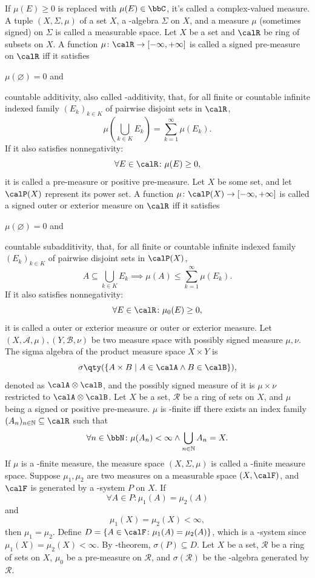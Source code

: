 \documentclass[a4paper,12pt]{article}
\begin{document}
If $\mu(E)\geq 0$ is replaced with $\mu(E)\in\bbC$, it's called a complex-valued measure.
A tuple $(X,\Sigma,\mu)$ of a set $X$, a \text{\textsigma}-algebra $\Sigma$ on $X$, and a measure $\mu$ (sometimes signed) on $\Sigma$ is called a measurable space.
Let $X$ be a set and $\calR$ be ring of subsets on $X$. A function $\mu\colon\calR\to[-\infty,+\infty]$ is called a signed pre-measure on $\calR$ iff it satisfies
\bit
\item $\mu(\varnothing)=0$ and
\item countable additivity, also called \text{\textsigma}-additivity, that, for all finite or countable infinite indexed family $(E_k)_{k\in K}$ of pairwise disjoint sets in $\calR$,
\[\mu\left(\bigcup_{k\in K}E_k\right)=\sum_{k=1}^\infty\mu(E_k).\]
\eit
If it also satisfies nonnegativity:
\[\forall E\in\calR\colon\mu(E)\geq 0,\]
it is called a pre-measure or positive pre-measure.
Let $X$ be some set, and let $\calP(X)$ represent its power set. A function $\mu\colon\calP(X)\to[-\infty,+\infty]$ is called a signed outer or exterior measure on $\calR$ iff it satisfies
\bit
\item $\mu(\varnothing)=0$ and
\item countable subadditivity, that, for all finite or countable infinite indexed family $(E_k)_{k\in K}$ of pairwise disjoint sets in $\calP(X)$,
\[A\subseteq\bigcup_{k\in K}E_k\implies\mu(A)\leq\sum_{k=1}^\infty\mu(E_k).\]
\eit
If it also satisfies nonnegativity:
\[\forall E\in\calR\colon\mu_0(E)\geq 0,\]
it is called a outer or exterior measure or outer or exterior measure.
Let $(X,\mathcal{A},\mu),(Y,\mathcal{B},\nu)$ be two measure space with possibly signed measure $\mu,\nu$. The sigma algebra of the product measure space $X\times Y$ is
\[\sigma\qty(\{A\times B\mid A\in\calA\land B\in\calB\}),\]
denoted as $\calA\otimes\calB$, and the possibly signed measure of it is $\mu\times\nu$ restricted to $\calA\otimes\calB$.
Let $X$ be a set, $\mathcal{R}$ be a ring of sets on $X$, and $\mu$ being a signed or positive pre-measure. $\mu$ is \text{\textsigma}-finite iff there exists an index family $(A_n)_{n\in\mathbb{N}}\subseteq\calR$ such that
\[\forall n\in\bbN\colon\mu(A_n)<\infty\land\bigcup_{n\in\mathbb{N}}A_n=X.\]
If $\mu$ is a \text{\textsigma}-finite measure, the measure space $(X,\Sigma,\mu)$ is called a \text{\textsigma}-finite measure space.
Suppose $\mu_1,\mu_2$ are two measures on a measurable space $(X,\calF)$, and $\calF$ is generated by a \textpi-system $P$ on $X$. If
\[\forall A\in P\colon\mu_1(A)=\mu_2(A)\]
and
\[\mu_1(X)=\mu_2(X)<\infty,\]
then $\mu_1=\mu_2$.
\bpr
Define $D=\{A\in\calF\colon\mu_1(A)=\mu_2(A)\}$, which is a \textlambda-system since $\mu_1(X)=\mu_2(X)<\infty$. By \textpi-\textlambda theorem, $\sigma(P)\subseteq D$.
\epr
{}
Let $X$ be a set, $\mathcal{R}$ be a ring of sets on $X$, $\mu_0$ be a pre-measure on $\mathcal{R}$, and $\sigma(\mathcal{R})$ be the \text{\textsigma}-algebra generated by $\mathcal{R}$.
\end{document}
